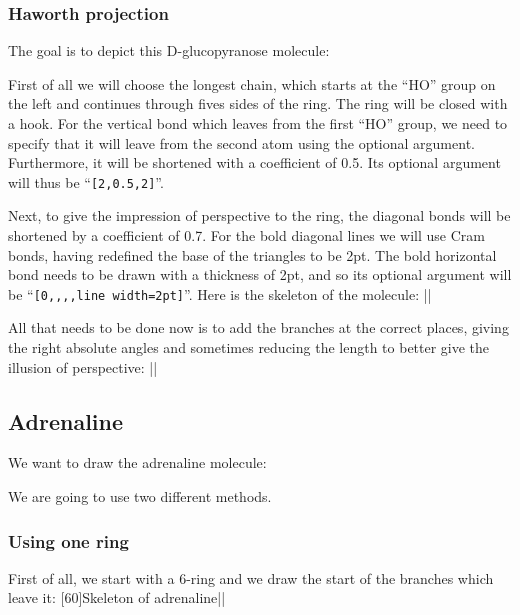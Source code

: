 \documentclass[10pt]{article}
\makeatletter
\newcommand\make@car@active[1]{%
	\catcode`#1\active
	\begingroup
		\lccode`\~`#1\relax
		\lowercase{\endgroup\def~}%
}
\newif\if@exstar
\newcommand\exemple{%
	\begingroup
	\parskip\z@
	\@makeother\;\@makeother\!\@makeother\?\@makeother\:%
	\@ifstar{\@exstartrue\exemple@}{\@exstarfalse\exemple@}}
\newcommand\exemple@[2][65]{%
	\medbreak\noindent
	\begingroup
		\let\do\@makeother\dospecials
		\make@car@active\ { {}}%
		\make@car@active\^^M{\par\leavevmode}%
		\make@car@active\^^I{\space\space}%
		\make@car@active\,{\leavevmode\kern\z@\string,}%
		\make@car@active\-{\leavevmode\kern\z@\string-}%
		\make@car@active\>{\leavevmode\kern\z@\string>}%
		\make@car@active\<{\leavevmode\kern\z@\string<}%
		\exemple@@{#1}{#2}%
}
\newcommand\exemple@@[3]{%
	\def\@tempa##1#3{\exemple@@@{#1}{#2}{##1}}%
	\@tempa
}
\newcommand\exemple@@@[3]{%
	\xdef\the@code{#3}%
	\endgroup
	\if@exstar
		\begingroup
			\fboxrule0.4pt
			\let\breakboxparindent\z@
			\def\bkvz@bottom{\hrule\@height\fboxrule}%
			\let\bkvz@before@breakbox\relax
			\def\bkvz@set@linewidth{\advance\linewidth\dimexpr-2\fboxrule-2\fboxsep}%
			\def\bkvz@left{\vrule\@width\fboxrule\hskip\fboxsep}%
			\def\bkvz@right{\hskip\fboxsep\vrule\@width\fboxrule}%
			\def\bkvz@top{\hbox to \hsize{%
				\vrule\@width\fboxrule\@height\fboxrule
				\leaders\bkvz@bottom\hfill
				\sffamily
				\fboxsep\z@
				\colorbox{black}{\kern0.25em\color{white}\footnotesize\lower0.5ex\hbox{\strut#2}\kern0.25em}%
				\leaders\bkvz@bottom\hfill
				\vrule\@width\fboxrule\@height\fboxrule}}%
			\breakbox
				\kern.5ex\relax
				\ttfamily\footnotesize\the@code\par
				\normalfont
				\kern3pt
				\hrule height0.1pt width\linewidth depth0.1pt
				\vskip5pt
				\rightskip0pt plus 1fill
				\everypar{{\color{lightgray}\rlap{\vrule height0.1pt width\linewidth depth0.1pt}}\hskip0pt plus 1fill}%
				\newlinechar`\^^M\everyeof{\noexpand}\scantokens{#3}\par
			\endbreakbox
		\endgroup
	\else
		\vskip0.5ex
		\boxput*(0,1)
			{\fboxsep\z@
			\hbox{\sffamily\colorbox{black}{\leavevmode\kern0.25em{\color{white}\footnotesize\strut#2}\kern0.25em}}%
			}%
			{\fboxsep5pt
			\fbox{%
				$\vcenter{\hsize\dimexpr0.#1\linewidth-\fboxsep-\fboxrule\relax
					\kern5pt\parskip0pt \ttfamily\footnotesize\the@code}%
				\vcenter{\kern5pt\hsize\dimexpr\linewidth-0.#1\linewidth-\fboxsep-\fboxrule\relax
					\everypar{{\color{lightgray}\rlap{\vrule height0.1pt width\dimexpr\linewidth-0.#1\linewidth-\fboxsep-\fboxrule depth0.1pt}}}%
					\footnotesize\newlinechar`\^^M\everyeof{\noexpand}\scantokens{#3}}$%
				}%
			}%
	\fi
	\medbreak
	\endgroup
}
\makeatother
\begin{document}
\subsubsection{Haworth projection}
The goal is to depict this D-glucopyranose molecule:

First of all we will choose the longest chain, which starts at the ``HO'' group on the left and continues through fives sides of the ring. The ring will be closed with a hook. For the vertical bond which leaves from the first ``HO'' group, we need to specify that it will leave from the second atom using the optional argument. Furthermore, it will be shortened with a coefficient of 0.5. Its optional argument will thus be ``\verb/[2,0.5,2]/''.

Next, to give the impression of perspective to the ring, the diagonal bonds will be shortened by a coefficient of 0.7. For the bold diagonal lines we will use Cram bonds, having redefined the base of the triangles to be 2pt. The bold horizontal bond needs to be drawn with a thickness of 2pt, and so its optional argument will be ``\verb/[0,,,,line width=2pt]/''. Here is the skeleton of the molecule:
\exemple{Structure}||

All that needs to be done now is to add the branches at the correct places, giving the right absolute angles and sometimes reducing the length to better give the illusion of perspective:
\exemple{Projection de Haworth}||

\subsection{Adrenaline}
We want to draw the adrenaline molecule:

We are going to use two different methods.

\subsubsection{Using one ring}
First of all, we start with a 6-ring and we draw the start of the branches which leave it:
\exemple[60]{Skeleton of adrenaline}||
\end{document}
